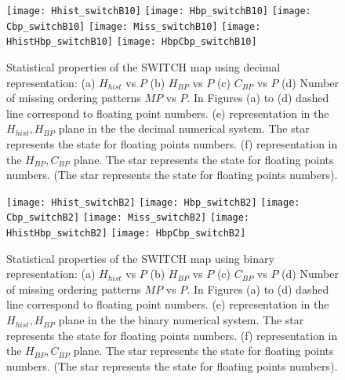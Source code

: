 \begin{figure}
\texttt{[image: Hhist\_switchB10]}
\texttt{[image: Hbp\_switchB10]}
\texttt{[image: Cbp\_switchB10]}
\texttt{[image: Miss\_switchB10]}
\texttt{[image: HhistHbp\_switchB10]}
\texttt{[image: HbpCbp\_switchB10]}
\caption{Statistical properties of the SWITCH map using decimal representation: (a) $H_{hist}$ vs $P$ (b) $H_{BP}$ vs $P$ (c) $C_{BP}$ vs $P$ (d) Number of missing ordering patterns $MP$ vs $P$. In Figures (a) to (d) dashed line correspond to floating point numbers. (e) representation in the $H_{hist},H_{BP}$ plane in the the decimal numerical system.  The star represents the state for floating points numbers. (f) representation in the $H_{BP},C_{BP}$ plane.  The star represents the state for floating points numbers. (The star represents the state for floating points numbers). } \label{fig:seqdec}
\end{figure}

\begin{figure}
\texttt{[image: Hhist\_switchB2]}
\texttt{[image: Hbp\_switchB2]}
\texttt{[image: Cbp\_switchB2]}
\texttt{[image: Miss\_switchB2]}
\texttt{[image: HhistHbp\_switchB2]}
\texttt{[image: HbpCbp\_switchB2]}
\caption{Statistical properties of the SWITCH map using binary representation: (a) $H_{hist}$ vs $P$ (b) $H_{BP}$ vs $P$ (c) $C_{BP}$ vs $P$ (d) Number of missing ordering patterns $MP$ vs $P$. In Figures (a) to (d) dashed line correspond to floating point numbers. (e) representation in the $H_{hist},H_{BP}$ plane in the the binary numerical system.  The star represents the state for floating points numbers. (f) representation in the $H_{BP},C_{BP}$ plane.  The star represents the state for floating points numbers. (The star represents the state for floating points numbers). } \label{fig:seqbin}
\end{figure}

